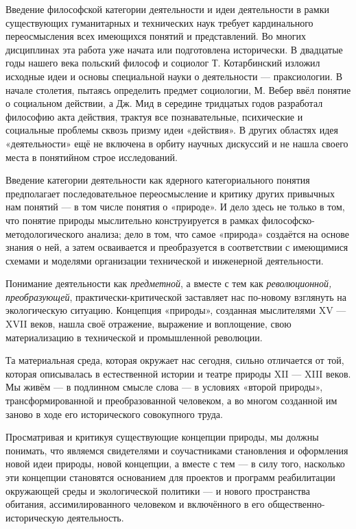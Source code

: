 \documentclass[11pt,a4paper]{article}
\begin{document}
Введение философской категории деятельности и идеи деятельности в рамки
существующих гуманитарных и технических наук требует кардинального
переосмысления всех имеющихся понятий и представлений. Во многих дисциплинах
эта работа уже начата или подготовлена исторически. В двадцатые годы нашего
века польский философ и социолог Т. Котарбинский изложил исходные идеи и
основы специальной науки о деятельности — праксиологии. В начале столетия,
пытаясь определить предмет социологии, М. Вебер ввёл понятие о социальном
действии, а Дж. Мид в середине тридцатых годов разработал философию акта
действия, трактуя все познавательные, психические и социальные проблемы сквозь
призму идеи «действия». В других областях идея «деятельности» ещё не включена
в орбиту научных дискуссий и не нашла своего места в понятийном строе
исследований. 

Введение категории деятельности как ядерного категориального понятия
предполагает последовательное переосмысление и критику других привычных нам
понятий — в том числе понятия о «природе». И дело здесь не только в том, что
понятие природы мыслительно конструируется в рамках
философско-методологического анализа; дело в том, что самое «природа»
создаётся на основе знания о ней, а затем осваивается и преобразуется в
соответствии с имеющимися схемами и моделями организации технической и
инженерной деятельности. 

Понимание деятельности как \emph{предметной}, а вместе с тем как
\emph{революционной, преобразующей}, практически-критической заставляет нас
по-новому взглянуть на экологическую ситуацию. Концепция «природы», созданная
мыслителями XV — XVII веков, нашла своё отражение, выражение и воплощение,
свою материализацию в технической и промышленной революции.

Та материальная среда, которая окружает нас сегодня, сильно отличается от той,
которая описывалась в естественной истории и театре природы XII — XIII
веков. Мы живём — в подлинном смысле слова — в условиях «второй природы»,
трансформированной и преобразованной человеком, а во многом созданной им
заново в ходе его исторического совокупного труда. 

Просматривая и критикуя существующие концепции природы, мы должны понимать,
что являемся свидетелями и соучастниками становления и оформления новой идеи
природы, новой концепции, а вместе с тем — в силу того, насколько эти
концепции становятся основанием для проектов и программ реабилитации
окружающей среды и экологической политики — и нового пространства обитания,
ассимилированного человеком и включённого в его общественно-историческую
деятельность. 
\end{document}
